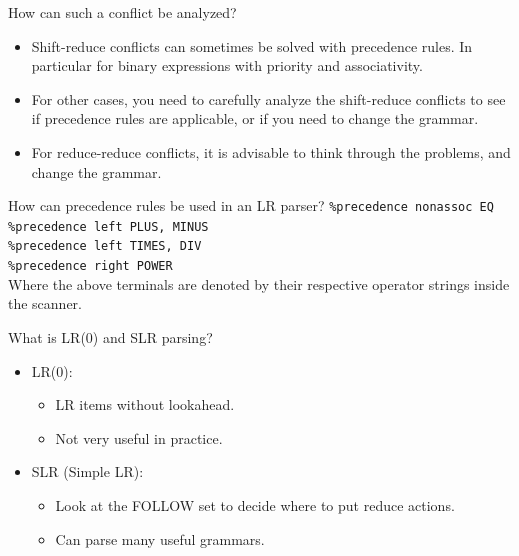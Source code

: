\documentclass[11pt]{beamer}
\begin{document}
\begin{frame}
\begin{block}{How can such a conflict be analyzed?}
\begin{itemize}
\item Shift-reduce conflicts can sometimes be solved with precedence rules. In particular for binary expressions with priority and associativity.
\item For other cases, you need to carefully analyze the shift-reduce conflicts to see if precedence rules are applicable, or if you need to change the grammar.
\item For reduce-reduce conflicts, it is advisable to think through the problems, and change the grammar.
\end{itemize}
\end{block}
\end{frame}
\begin{frame}

\begin{block}{How can precedence rules be used in an LR parser?}
\texttt{\%precedence nonassoc EQ}\\
\texttt{\%precedence left PLUS, MINUS}\\
\texttt{\%precedence left TIMES, DIV}\\
\texttt{\%precedence right POWER}\\
Where the above terminals are denoted by their respective operator strings inside the scanner.
\end{block}

\begin{block}{What is LR(0) and SLR parsing?}
\begin{itemize}
\item LR(0):
\begin{itemize}
\item LR items without lookahead.
\item Not very useful in practice.
\end{itemize}

\item SLR (Simple LR):
\begin{itemize}
\item Look at the FOLLOW set to decide where to put reduce actions.
\item Can parse many useful grammars.
\end{itemize}

\end{itemize}
\end{block}
\end{frame}
\end{document}
